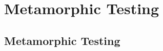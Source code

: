 
\section{Metamorphic Testing}
\subsection{Metamorphic Testing}
\begin{frame}
  \begin{center}
  \end{center}
\end{frame}